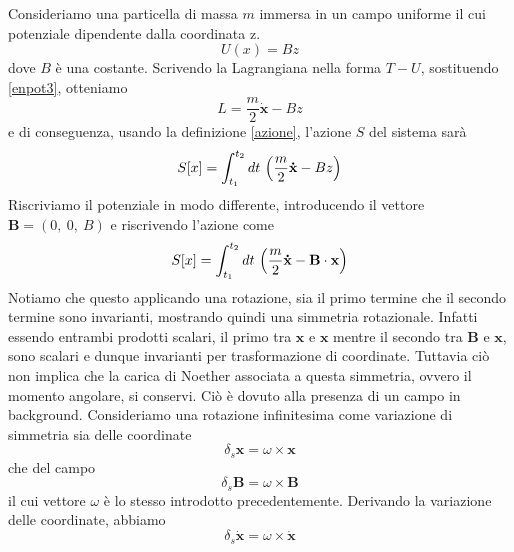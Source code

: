 \begin{example} 
    Consideriamo una particella di massa $m$ immersa in un campo uniforme il cui potenziale dipendente dalla coordinata z. 
\begin{equation}\label{enpot3}
    U(x) = B z
\end{equation}
    dove $B$ è una costante. Scrivendo la Lagrangiana nella forma $T - U$, sostituendo \eqref{enpot3}, otteniamo 
\begin{equation} \label{lag3}
    L = \frac{m}{2} \mathbf{\dot x} - B z
\end{equation}
    e di conseguenza, usando la definizione \eqref{azione}, l'azione $S$ del sistema sarà
\begin{equation}
    S[x] = \int_{t_1}^{t_2}dt~ \Big( \frac{m}{2} \mathbf{\dot x} - B z \Big)
\end{equation}
    Riscriviamo il potenziale in modo differente, introducendo il vettore $\mathbf B = (0,~0,~B)$ e riscrivendo l'azione come
\begin{equation}
    S[x] = \int_{t_1}^{t_2}dt~ \Big( \frac{m}{2} \mathbf{\dot x} - \mathbf B \cdot \mathbf x \Big)
\end{equation}
    Notiamo che questo applicando una rotazione, sia il primo termine che il secondo termine sono invarianti, mostrando quindi una simmetria rotazionale. Infatti essendo entrambi prodotti scalari, il primo tra $\mathbf x$ e $\mathbf x$ mentre il secondo tra $\mathbf B$ e $\mathbf x$, sono scalari e dunque invarianti per trasformazione di coordinate. Tuttavia ciò non implica che la carica di Noether associata a questa simmetria, ovvero il momento angolare, si conservi. Ciò è dovuto alla presenza di un campo in background. Consideriamo una rotazione infinitesima come variazione di simmetria sia delle coordinate 
\begin{equation}
    \delta_s \mathbf x = \omega \times \mathbf x
\end{equation}
    che del campo
\begin{equation}
    \delta_s \mathbf B = \omega \times \mathbf B
\end{equation}
    il cui vettore $\omega$ è lo stesso introdotto precedentemente. Derivando la variazione delle coordinate, abbiamo
\begin{equation}
    \delta_s \mathbf{\dot x} = \omega \times \mathbf{\dot x}
\end{equation}
    

\end{example}
